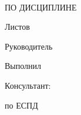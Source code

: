\begin{ESKDtitlePage}
    \begin{center}
        \envMinistr \\
        \envEducation \\
        \envUniversity \\
        \envCathedra \\
    \end{center}

    \vfill

    \begin{center}
        \textbf{\envTopic} \\
    \end{center}

    \vfill

    \begin{center}
        \envDocumentTopic \\
        ПО ДИСЦИПЛИНЕ \envDiscipline \\
    \end{center}

    \vfill

    \begin{center}
        \textbf{\envCode}
    \end{center}

    \begin{flushright}
        \begin{minipage}[t]{.45\textwidth}
            Листов \pageref{LastPage} \\
        \end{minipage}
    \end{flushright}

    \vfill

    \begin{flushright}
        \begin{minipage}[t]{.49\textwidth}
            \begin{minipage}[t]{.75\textwidth}
                \begin{flushright}
                    Руководитель

                    \hspace{0pt}

                    Выполнил

                    \hspace{0pt}

                    Консультант:

                    по ЕСПД
                \end{flushright}
            \end{minipage}
        \end{minipage}
        \begin{minipage}[t]{.49\textwidth}
            \begin{flushright}
                \begin{minipage}[t]{.75\textwidth}
                    \envTeacherInitials~\envTeacherSurname


\end{minipage}
\end{flushright}
\end{minipage}
\end{flushright}
\end{ESKDtitlePage}
